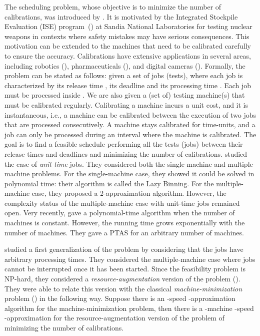 The scheduling problem, whose objective is to minimize the number of calibrations, was introduced by \cite{bender2013efficient}. It is motivated by the Integrated Stockpile Evaluation (ISE) program~(\cite{ise}) at Sandia National Laboratories for testing nuclear weapons in contexts where safety mistakes may have serious consequences. This motivation can be extended to the machines that need to be calibrated carefully to ensure the accuracy. Calibrations have extensive applications in several areas, including robotics (\cite{bernhardt1993robot, evans1982method, nguyen2013new}), pharmaceuticals (\cite{forina1998multivariate, bansal2004qualification}), and digital cameras  (\cite{baer2005self, barton2006sensor, zhang2002method}).
Formally, the problem can be stated as follows:  given a set  of  jobs (tests), where each job  is characterized by its release time , its deadline  and its processing time . Each job must be processed inside . We are also given a (set of) testing machine(s) that must be calibrated regularly. Calibrating a machine incurs a unit cost, and it is instantaneous, i.e., a machine can be calibrated between the execution of two jobs that are processed consecutively. A machine stays calibrated for  time-units, and a job can only be processed during an interval where the machine is calibrated. The goal is to find a feasible schedule performing all the tests (jobs) between their release times and deadlines and minimizing the number of calibrations. \cite{bender2013efficient} studied the case of \emph{unit-time} jobs. They considered both the single-machine and multiple-machine problems. For the single-machine case, they showed it could be solved in polynomial time: their algorithm is called the Lazy Binning. For the multiple-machine case, they proposed a 2-approximation algorithm. However, the complexity status of the multiple-machine case with unit-time jobs remained open. Very recently, \cite{ChenLL019} gave a polynomial-time algorithm when the number of machines is constant. However, the running time grows exponentially with the number of machines. They gave a PTAS for an arbitrary number of machines.

\cite{FinemanS15} studied a first generalization of the problem by considering that the jobs have arbitrary processing times. They considered the multiple-machine case where jobs cannot be interrupted once it has been started. Since the feasibility problem is NP-hard, they considered a {\em resource-augmentation}  version of the problem (\cite{KalyanasundaramP00}). They were able to relate this version with the classical {\em machine-minimization} problem (\cite{PhillipsSTW02}) in the following way. Suppose there is an -speed -approximation algorithm for the machine-minimization problem, then there is a -machine -speed -approximation for the resource-augmentation version of the problem of minimizing the number of calibrations.  

